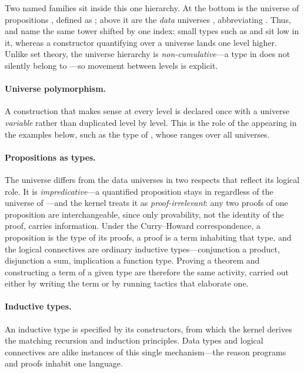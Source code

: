 Two named families sit inside this one hierarchy. At the bottom is the universe of
propositions , defined as ; above it are the
\emph{data} universes , abbreviating . Thus,
 and  name the same tower shifted by one index: small
types such as  and  sit low in it,
whereas a constructor quantifying over a universe lands one level higher. Unlike set theory,
the universe hierarchy is \emph{non-cumulative}---a type in  does not silently
belong to ---so movement between levels is explicit.

\paragraph{Universe polymorphism.}
A construction that makes sense at every level is declared once with a universe
\emph{variable}  rather than duplicated level by level. This is the
role of the  appearing in the examples below, such as the type
 of , whose  ranges over all
universes.

\paragraph{Propositions as types.}
The universe  differs from the data universes in two respects that reflect its
logical role. It is \emph{impredicative}---a quantified proposition
 stays in  regardless of the universe of
---and the kernel treats it as \emph{proof-irrelevant}: any two proofs
of one proposition are interchangeable, since only provability, not the identity
of the proof, carries information. Under the Curry--Howard correspondence, a
proposition  is the type of its proofs, a proof is a term
 inhabiting that type, and the logical connectives are ordinary inductive
types---conjunction a product, disjunction a sum, implication a function
type. Proving a theorem and constructing a term of a given type are therefore the
same activity, carried out either by writing the term or by running tactics that
elaborate one.

\paragraph{Inductive types.}
An inductive type is specified by its constructors, from which the kernel
derives the matching recursion and induction principles. Data types and logical
connectives are alike instances of this single mechanism---the reason programs
and proofs inhabit one language.

